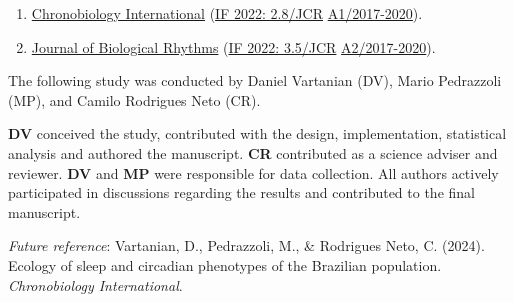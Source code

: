 \documentclass[
12pt,
openright,
oneside,
a4paper,
chapter=TITLE,
section=TITLE,
french,
spanish,
brazil,
english
]{abntex2}\usepackage{array}
\newcommand{\microskip}{\vspace{\microskipamount}}
\begin{document}
\begin{tcolorbox}[enhanced jigsaw, arc=.35mm, toprule=.15mm, opacitybacktitle=0.6, rightrule=.15mm, opacityback=0, colframe=quarto-callout-note-color-frame, titlerule=0mm, colback=white, toptitle=1mm, coltitle=black, left=2mm, colbacktitle=quarto-callout-note-color!10!white, title=\textcolor{quarto-callout-note-color}{\faInfo}\hspace{0.5em}{Target journal}, bottomrule=.15mm, breakable, bottomtitle=1mm, leftrule=.75mm]

\begin{enumerate}
\def\labelenumi{\arabic{enumi}.}
\tightlist
\item
  \href{https://www.tandfonline.com/action/authorSubmission?show=instructions&journalCode=icbi20}{Chronobiology
  International} (\href{https://jcr.clarivate.com/jcr/}{IF 2022:
  2.8/JCR} \textbar{}
  \href{https://sucupira.capes.gov.br/sucupira/public/consultas/coleta/veiculoPublicacaoQualis/listaConsultaGeralPeriodicos.jsf}{A1/2017-2020}).
\item
  \href{https://journals.sagepub.com/author-instructions/JBR}{Journal of
  Biological Rhythms} (\href{https://jcr.clarivate.com/jcr/}{IF 2022:
  3.5/JCR} \textbar{}
  \href{https://sucupira.capes.gov.br/sucupira/public/consultas/coleta/veiculoPublicacaoQualis/listaConsultaGeralPeriodicos.jsf}{A2/2017-2020}).
\end{enumerate}

\end{tcolorbox}

\begin{tcolorbox}[enhanced jigsaw, arc=.35mm, toprule=.15mm, opacitybacktitle=0.6, rightrule=.15mm, opacityback=0, colframe=quarto-callout-note-color-frame, titlerule=0mm, colback=white, toptitle=1mm, coltitle=black, left=2mm, colbacktitle=quarto-callout-note-color!10!white, title=\textcolor{quarto-callout-note-color}{\faInfo}\hspace{0.5em}{Note}, bottomrule=.15mm, breakable, bottomtitle=1mm, leftrule=.75mm]

The following study was conducted by Daniel Vartanian (DV), Mario
Pedrazzoli (MP), and Camilo Rodrigues Neto (CR).

\microskip

\textbf{DV} conceived the study, contributed with the design,
implementation, statistical analysis and authored the manuscript.
\textbf{CR} contributed as a science adviser and reviewer. \textbf{DV}
and \textbf{MP} were responsible for data collection. All authors
actively participated in discussions regarding the results and
contributed to the final manuscript.

\microskip

\emph{Future reference}: Vartanian, D., Pedrazzoli, M., \& Rodrigues
Neto, C. (2024). Ecology of sleep and circadian phenotypes of the
Brazilian population. \emph{Chronobiology International}.

\end{tcolorbox}
\end{document}
